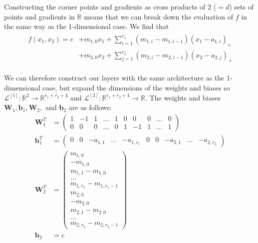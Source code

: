 \documentclass{somasmsc}
\begin{document}
Constructing the corner points and gradients as cross products of 2 ($=d$) sets of points and gradients in $\mathbb{R}$ means that we can break down the evaluation of $f$ in the same way as the 1-dimensional case. We find that
\begin{align}\label{piece:eq2}
\begin{split}
f(x_1, x_2) = c &+ m_{1,0} x_1 + \sum_{i=1}^{r_1} \left(m_{1,i} - m_{1,i-1}\right) \left(x_1 - a_{1,i}\right)_+ \\
&+ m_{2,0} x_2 + \sum_{j=1}^{r_2} \left(m_{2,i} - m_{2,i-1}\right) \left(x_2 - a_{2,j}\right)_+
\end{split}
\end{align}

We can therefore construct our layers with the same architecture as the 1-dimensional case, but expand the dimensions of the weights and biases so $\mathcal{L}^{\left[1\right]}: \mathbb{R}^2 \rightarrow \mathbb{R}^{r_1 + r_2 + 4}$ and $\mathcal{L}^{\left[2\right]}: \mathbb{R}^{r_1 + r_2 + 4} \rightarrow \mathbb{R}$. The weights and biases $\mathbf{W}_1, \pmb{b}_1, \mathbf{W}_2,$ and $\pmb{b}_2$ are as follows:
\begin{align*}
\mathbf{W}_1^T &=
\begin{pmatrix}
    1 & -1 & 1 & \dots & 1 & 0 & 0 & 0 & \dots & 0 \\
    0 & 0 & 0 & \dots & 0 & 1 & -1 & 1 & \dots & 1
\end{pmatrix} \\
\pmb{b}_1^T &= 
\begin{pmatrix}
    0 & 0 & -a_{1,1} & \dots & -a_{1,r_1} & 0 & 0 & -a_{2,1} & \dots & -a_{2,r_2}
\end{pmatrix} \\
\mathbf{W}_2^T &= 
\begin{pmatrix}
    m_{1,0} \\
    -m_{1,0} \\
    m_{1,1} - m_{1,0} \\
    \dots \\
    m_{1,r_1} - m_{1,r_1 - 1} \\
    m_{2,0} \\
    -m_{2,0} \\
    m_{2,1} - m_{2,0} \\
    \dots \\
    m_{2,r_2} - m_{2,r_2 - 1}
\end{pmatrix} \\
\pmb{b}_2 &= c
\end{align*}
\end{document}
